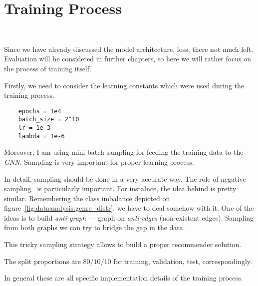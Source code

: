 \section{Training Process}~\label{training-process}

Since we have already discussed the model architecture, loss, there not much
left. Evaluation will be considered in further chapters, so here we will rather
focus on the process of training itself.

Firstly, we need to consider the learning constants which were used during the
training process.

\begin{verbatim}
    epochs = 1e4
    batch_size = 2^10
    lr = 1e-3
    lambda = 1e-6
\end{verbatim}

Moreover, I am using mini-batch sampling for feeding the training data to the
\textit{GNN}. Sampling is very important for proper learning process.

In detail, sampling should be done in a very accurate way. The role of negative
sampling~\cite{yangUnderstandingNegativeSampling2020} is particularly
important. For instalnce, the idea behind is pretty similar. Remembering the
class imbalance depicted on figure~\ref{fig:dataanalysis:genre_distr}, we have
to deal somehow with it. One of the ideas is to build \textit{anti-graph} ---
graph on \textit{anti-edges} (non-existent edges). Sampling from both graphs we
can try to bridge the gap in the data.

This tricky sampling strategy allows to build a proper recommender solution.

The split proportions are \(80/10/10\) for training, validation, test,
correspondingly.

In general these are all specific implementation details of the training
process.